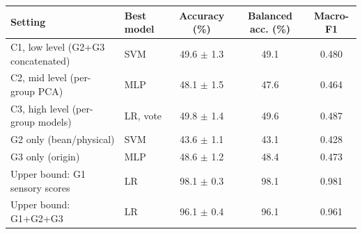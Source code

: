 \begin{tabular}{llccc}
\toprule
\textbf{Setting} & \textbf{Best model} & \textbf{Accuracy (\%)} & \textbf{Balanced acc. (\%)} & \textbf{Macro-F1} \\
\midrule
C1, low level (G2+G3 concatenated) & SVM & 49.6 $\pm$ 1.3 & 49.1 & 0.480 \\
C2, mid level (per-group PCA) & MLP & 48.1 $\pm$ 1.5 & 47.6 & 0.464 \\
C3, high level (per-group models) & LR, vote & 49.8 $\pm$ 1.4 & 49.6 & 0.487 \\
G2 only (bean/physical) & SVM & 43.6 $\pm$ 1.1 & 43.1 & 0.428 \\
G3 only (origin) & MLP & 48.6 $\pm$ 1.2 & 48.4 & 0.473 \\
Upper bound: G1 sensory scores & LR & 98.1 $\pm$ 0.3 & 98.1 & 0.981 \\
Upper bound: G1+G2+G3 & LR & 96.1 $\pm$ 0.4 & 96.1 & 0.961 \\
\bottomrule
\end{tabular}
